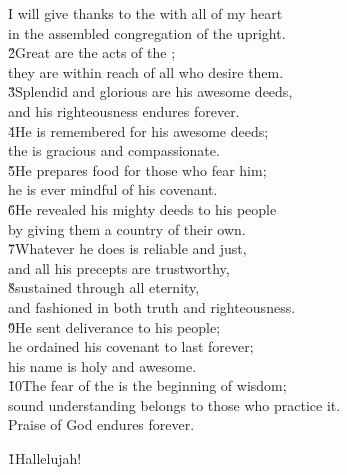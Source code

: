 \begin{poetry}
\poeml I will give thanks to the  with all of my heart \\
\poemll    in the assembled congregation of the upright. \\
\poeml \v{2}Great are the acts of the ; \\
\poemll    they are within reach of all who desire them. \\
\poeml \v{3}Splendid and glorious are his awesome deeds, \\
\poemll    and his righteousness endures forever. \\
\poeml \v{4}He is remembered for his awesome deeds; \\
\poemll    the  is gracious and compassionate. \\
\poeml \v{5}He prepares food for those who fear him; \\
\poemll    he is ever mindful of his covenant. \\
\poeml \v{6}He revealed his mighty deeds to his people \\
\poemll    by giving them a country of their own. \\
\poeml \v{7}Whatever he does is reliable and just, \\
\poemll    and all his precepts are trustworthy, \\
\poeml \v{8}sustained through all eternity, \\
\poemll    and fashioned in both truth and righteousness. \\
\poeml \v{9}He sent deliverance to his people; \\
\poemll    he ordained his covenant to last forever; \\
\poemlll       his name is holy and awesome. \\
\poeml \v{10}The fear of the  is the beginning of wisdom; \\
\poemll    sound understanding belongs to those who practice it. \\
\poeml Praise of God endures forever.
\end{poetry}

\begin{poetry}
\poeml \v{1}Hallelujah!
\end{poetry}

